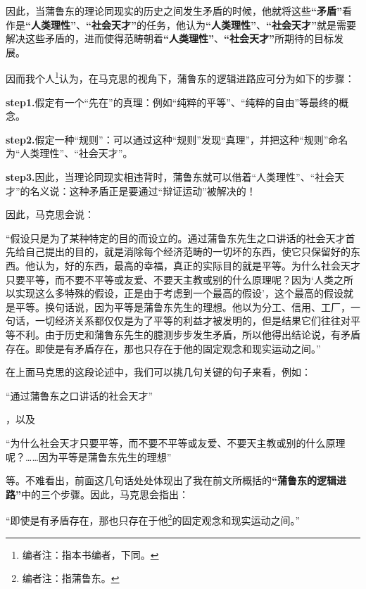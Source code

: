 \documentclass[a4paper,twoside,12pt,AutoFakeBold]{ctexart}
\begin{document}
因此，当蒲鲁东的理论同现实的历史之间发生矛盾的时候，他就将这些\textbf{“矛盾”}看作是\textbf{“人类理性”}、\textbf{“社会天才”}的任务，他认为\textbf{“人类理性”}、\textbf{“社会天才”}就是需要解决这些矛盾的，进而使得范畴朝着\textbf{“人类理性”}、\textbf{“社会天才”}所期待的目标发展。

因而我个人\footnote{编者注：指本书编者，下同。}认为，在马克思的视角下，蒲鲁东的逻辑进路应可分为如下的步骤：


\begin{tcolorbox}[colback=gray!20, colframe=gray!100, sharp corners, leftrule={3pt}, rightrule={0pt}, toprule={0pt}, bottomrule={0pt}, left={2pt}, right={2pt}, top={3pt}, bottom={3pt}] 
\textbf{step1.}假定有一个“先在”的真理：例如“纯粹的平等”、“纯粹的自由”等最终的概念。

\textbf{step2.}假定一种“规则”：可以通过这种“规则”发现“真理”，并把这种“规则”命名为“人类理性”、“社会天才”。

\textbf{step3.}因此，当理论同现实相违背时，蒲鲁东就可以借着“人类理性”、“社会天才”的名义说：这种矛盾正是要通过“辩证运动”被解决的！


\end{tcolorbox}

因此，马克思会说：
\begin{adjustwidth}{2em}{2em}
    \qquad\fangsong
    “假设只是为了某种特定的目的而设立的。通过蒲鲁东先生之口讲话的社会天才首先给自己提出的目的，就是消除每个经济范畴的一切坏的东西，使它只保留好的东西。他认为，好的东西，最高的幸福，真正的实际目的就是平等。为什么社会天才只要平等，而不要不平等或友爱、不要天主教或别的什么原理呢？因为‘人类之所以实现这么多特殊的假设，正是由于考虑到一个最高的假设’，这个最高的假设就是平等。换句话说，因为平等是蒲鲁东先生的理想。他以为分工、信用、工厂，一句话，一切经济关系都仅仅是为了平等的利益才被发明的，但是结果它们往往对平等不利。由于历史和蒲鲁东先生的臆测步步发生矛盾，所以他得出结论说，有矛盾存在。即使是有矛盾存在，那也只存在于他的固定观念和现实运动之间。”
\end{adjustwidth}

在上面马克思的这段论述中，我们可以挑几句关键的句子来看，例如：\begin{fangsong}
    “通过蒲鲁东之口讲话的社会天才”
\end{fangsong}，以及\begin{fangsong}
    “为什么社会天才只要平等，而不要不平等或友爱、不要天主教或别的什么原理呢？……因为平等是蒲鲁东先生的理想”
\end{fangsong}
等。不难看出，前面这几句话处处体现出了我在前文所概括的\textbf{“蒲鲁东的逻辑进路”}中的三个步骤。因此，马克思会指出：\begin{fangsong}
    “即使是有矛盾存在，那也只存在于他\footnote{编者注：指蒲鲁东。}的固定观念和现实运动之间。”
\end{fangsong}
\end{document}

